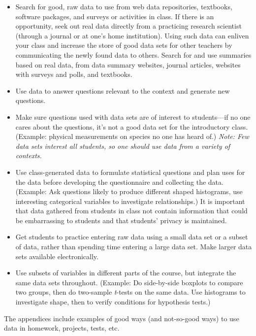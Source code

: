 \vspace{.2in}
\noindent {}

\begin{itemize}[leftmargin=1cm,  itemsep=.2em]
\item Search for good, raw data to use from web data repositories, textbooks, software packages, and surveys or activities in class. If there is an opportunity, seek out real data directly from a practicing research scientist (through a journal or at one's home institution). Using such data can enliven your class and increase the store of good data sets for other teachers by communicating the newly found data to others.
Search for and use summaries based on real data, from data summary websites, journal articles, websites with surveys and polls, and textbooks.
\item Use data to answer questions relevant to the context and generate new questions.
\item Make sure questions used with data sets are of interest to students---if no one cares about the questions, it's not a good data set for the introductory class. (Example: physical measurements on species no one has heard of.) \textit{Note:  Few data sets interest all students, so one should use data from a variety of contexts.}
\item Use class-generated data to formulate statistical questions and plan uses for the data before developing the questionnaire and collecting the data. (Example: Ask questions likely to produce different shaped histograms, use interesting categorical variables to investigate relationships.) It is important that data gathered from students in class not contain information that could be embarrassing to students and that students' privacy is maintained.
\item Get students to practice entering raw data using a small data set or a subset of data, rather than spending time entering a large data set. Make larger data sets available electronically.
\item Use subsets of variables in different parts of the course, but integrate the same data sets throughout. (Example: Do side-by-side boxplots to compare two groups, then do two-sample \textit{t}-tests on the same data. Use histograms to investigate shape, then to verify conditions for hypothesis tests.)
\end{itemize}
 
The appendices include examples of good ways (and not-so-good ways) to use data in homework, projects, tests, etc.

